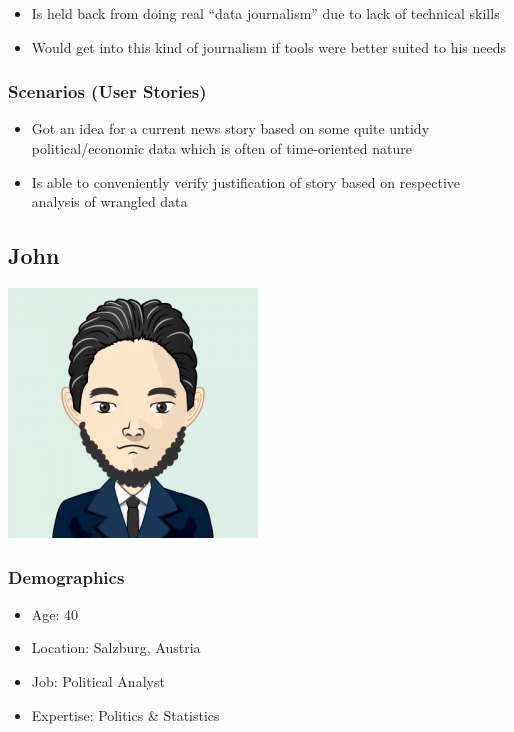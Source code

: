 \begin{itemize}
    \item Is held back from doing real ``data journalism'' due to lack of technical skills
    \item Would get into this kind of journalism if tools were better suited to his needs
\end{itemize}

\subsubsection{Scenarios (User Stories)}

\begin{itemize}
    \item Got an idea for a current news story based on some quite untidy political/economic data which is often of time-oriented nature
    \item Is able to conveniently verify justification of story based on respective analysis of wrangled data
\end{itemize}


\subsection{John}

\includegraphics[scale=0.5]{figures/requirements/persona-avatar-john}

\subsubsection{Demographics}

\begin{itemize}
    \item Age: 40
    \item Location: Salzburg, Austria
    \item Job: Political Analyst
    \item Expertise: Politics \& Statistics
\end{itemize}

